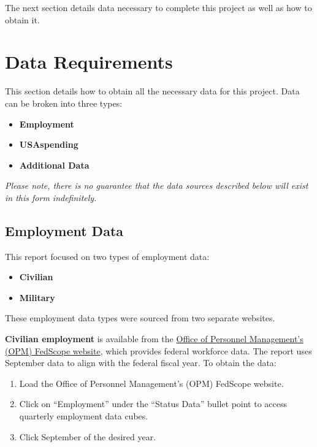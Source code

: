 \documentclass[
]{book}
\providecommand{\tightlist}{%
  \setlength{\itemsep}{0pt}\setlength{\parskip}{0pt}}
\begin{document}
The next section details data necessary to complete this project as well as how to obtain it.

\hypertarget{data}{%
\chapter{Data Requirements}\label{data}}

This section details how to obtain all the necessary data for this project. Data can be broken into three types:

\begin{itemize}
\tightlist
\item
  \textbf{Employment}
\item
  \textbf{USAspending}
\item
  \textbf{Additional Data}
\end{itemize}

\emph{Please note, there is no guarantee that the data sources described below will exist in this form indefinitely.}

\hypertarget{employment}{%
\section{Employment Data}\label{employment}}

This report focused on two types of employment data:

\begin{itemize}
\tightlist
\item
  \textbf{Civilian}\\
\item
  \textbf{Military}
\end{itemize}

These employment data types were sourced from two separate websites.

\textbf{Civilian employment} is available from the \href{https://www.fedscope.opm.gov/}{Office of Personnel Management's (OPM) FedScope website}, which provides federal workforce data. The report uses September data to align with the federal fiscal year. To obtain the data:

\begin{enumerate}
\def\labelenumi{\arabic{enumi}.}
\tightlist
\item
  Load the Office of Personnel Management's (OPM) FedScope website.
\item
  Click on ``Employment'' under the ``Status Data'' bullet point to access quarterly employment data cubes.
\item
  Click September of the desired year.
\end{enumerate}
\end{document}
